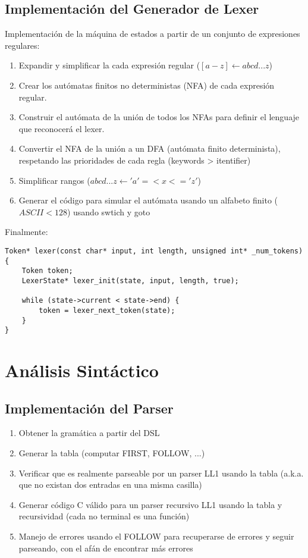 \documentclass[11pt]{article}
\begin{document}
\subsection{Implementación del Generador de Lexer}
Implementación de la máquina de estados a partir de un conjunto de expresiones regulares:

\begin{enumerate}
    \item Expandir y simplificar la cada expresión regular ($[a-z] \leftarrow abcd...z$)
    \item Crear los autómatas finitos no deterministas (NFA) de cada expresión regular.
    \item Construir el autómata de la unión de todos los NFAs para definir el lenguaje que reconocerá el lexer.
    \item Convertir el NFA de la unión a un DFA (autómata finito determinista), respetando las prioridades de cada regla (keywords > itentifier)
    \item Simplificar rangos ($abcd...z \leftarrow 'a' =< x <= 'z'$)
    \item Generar el código para simular el autómata usando un alfabeto finito ($ASCII < 128$) usando swtich y goto
\end{enumerate}


Finalmente:

\begin{lstlisting}
Token* lexer(const char* input, int length, unsigned int* _num_tokens) {
    Token token;
    LexerState* lexer_init(state, input, length, true);

    while (state->current < state->end) {
        token = lexer_next_token(state);
    }
}
\end{lstlisting}

\section{Análisis Sintáctico}
\subsection{Implementación del Parser}

\begin{enumerate}
    \item Obtener la gramática a partir del DSL
    \item Generar la tabla (computar FIRST, FOLLOW, ...)
    \item Verificar que es realmente parseable por un parser LL1 usando la tabla (a.k.a. que no existan dos entradas en una misma casilla)
    \item Generar código C válido para un parser recursivo LL1 usando la tabla y recursividad (cada no terminal es una función)
    \item Manejo de errores usando el FOLLOW para recuperarse de errores y seguir parseando, con el afán de encontrar más errores
\end{enumerate}
\end{document}
